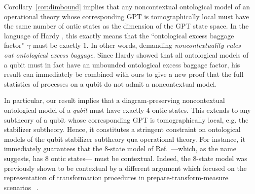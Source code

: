 \documentclass[onecolum,aps,groupedaddress,nofootinbib]{revtex4-2}
\newcommand{\rob}{\color{cyan}}
\newcommand{\blk}{\color{black}}
\begin{document}
 Corollary~\ref{cor:dimbound} implies that any noncontextual ontological model of an operational theory whose corresponding GPT is tomographically local must have the same number of ontic states as the dimension of the GPT state space. In the language of Hardy \cite{Hardy2004}, this exactly means that the ``ontological excess baggage factor'' $\gamma$ must be exactly $1$.  In other words, demanding {\em  noncontextuality rules out ontological excess baggage}. Since Hardy showed that all ontological models of a qubit must in fact have an unbounded ontological excess baggage factor, his result can immediately be combined with ours to give a new proof that the full statistics of processes on a qubit do not admit a noncontextual model.

In particular, our result implies that a diagram-preserving noncontextual ontological model of a {\em qubit} must have exactly $4$ ontic states. This extends to 
any subtheory of a qubit whose corresponding GPT is tomographically local, e.g. the stabilizer subtheory. Hence, it constitutes a stringent constraint on ontological models of the qubit stabilizer subtheory qua operational theory. 
For instance, it immediately guarantees that the $8$-state model of Ref.~\cite{8state}---which, as the name suggests, has 8 ontic states---
must be contextual.   Indeed, the $8$-state model was previously shown to be contextual by a different argument which focused on the representation of transformation procedures in prepare-transform-measure scenarios
~\cite{lillystone2019single}.

\end{document}
